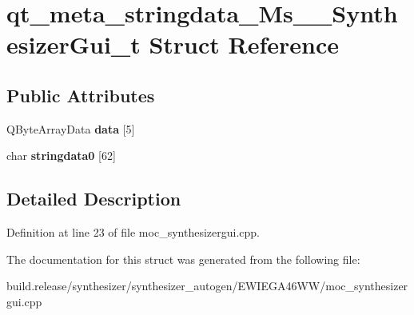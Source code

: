 \hypertarget{structqt__meta__stringdata___ms_____synthesizer_gui__t}{}\section{qt\+\_\+meta\+\_\+stringdata\+\_\+\+Ms\+\_\+\+\_\+\+Synthesizer\+Gui\+\_\+t Struct Reference}
\label{structqt__meta__stringdata___ms_____synthesizer_gui__t}
\subsection*{Public Attributes}
\begin{DoxyCompactItemize}
\item 
\mbox{\label{structqt__meta__stringdata___ms_____synthesizer_gui__t_aa3442e7e140ebc2cd5b4296db4b8380a}} 
Q\+Byte\+Array\+Data {\bfseries data} \mbox{[}5\mbox{]}
\item 
\mbox{\label{structqt__meta__stringdata___ms_____synthesizer_gui__t_a554365b673a2ee03ba5d03a1141689da}} 
char {\bfseries stringdata0} \mbox{[}62\mbox{]}
\end{DoxyCompactItemize}


\subsection{Detailed Description}


Definition at line 23 of file moc\+\_\+synthesizergui.\+cpp.



The documentation for this struct was generated from the following file\+:\begin{DoxyCompactItemize}
\item 
build.\+release/synthesizer/synthesizer\+\_\+autogen/\+E\+W\+I\+E\+G\+A46\+W\+W/moc\+\_\+synthesizergui.\+cpp\end{DoxyCompactItemize}
